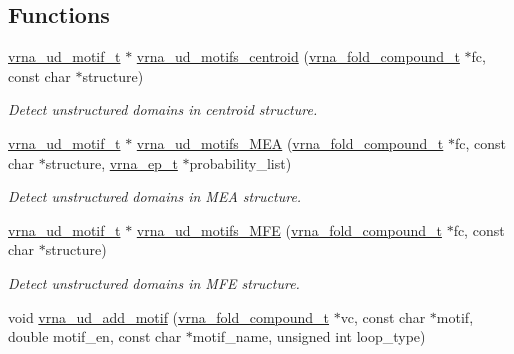 \subsection*{Functions}
\begin{DoxyCompactItemize}
\item 
\hyperlink{structvrna__unstructured__domain__motif__s}{vrna\+\_\+ud\+\_\+motif\+\_\+t} $\ast$ \hyperlink{group__domains__up_ga2039caedf194c5edec794866986d95ec}{vrna\+\_\+ud\+\_\+motifs\+\_\+centroid} (\hyperlink{group__fold__compound_ga1b0cef17fd40466cef5968eaeeff6166}{vrna\+\_\+fold\+\_\+compound\+\_\+t} $\ast$fc, const char $\ast$structure)
\begin{DoxyCompactList}\small\item\em Detect unstructured domains in centroid structure. \end{DoxyCompactList}\item 
\hyperlink{structvrna__unstructured__domain__motif__s}{vrna\+\_\+ud\+\_\+motif\+\_\+t} $\ast$ \hyperlink{group__domains__up_ga980126e9f350b64474b35f20fce2782c}{vrna\+\_\+ud\+\_\+motifs\+\_\+\+M\+EA} (\hyperlink{group__fold__compound_ga1b0cef17fd40466cef5968eaeeff6166}{vrna\+\_\+fold\+\_\+compound\+\_\+t} $\ast$fc, const char $\ast$structure, \hyperlink{group__struct__utils__plist_gab9ac98ab55ded9fb90043b024b915aca}{vrna\+\_\+ep\+\_\+t} $\ast$probability\+\_\+list)
\begin{DoxyCompactList}\small\item\em Detect unstructured domains in M\+EA structure. \end{DoxyCompactList}\item 
\hyperlink{structvrna__unstructured__domain__motif__s}{vrna\+\_\+ud\+\_\+motif\+\_\+t} $\ast$ \hyperlink{group__domains__up_ga464d086264dd6f45089a65acec4e8c21}{vrna\+\_\+ud\+\_\+motifs\+\_\+\+M\+FE} (\hyperlink{group__fold__compound_ga1b0cef17fd40466cef5968eaeeff6166}{vrna\+\_\+fold\+\_\+compound\+\_\+t} $\ast$fc, const char $\ast$structure)
\begin{DoxyCompactList}\small\item\em Detect unstructured domains in M\+FE structure. \end{DoxyCompactList}\item 
void \hyperlink{group__domains__up_ga55f7de5ef5b7472b0eeab9296b57f671}{vrna\+\_\+ud\+\_\+add\+\_\+motif} (\hyperlink{group__fold__compound_ga1b0cef17fd40466cef5968eaeeff6166}{vrna\+\_\+fold\+\_\+compound\+\_\+t} $\ast$vc, const char $\ast$motif, double motif\+\_\+en, const char $\ast$motif\+\_\+name, unsigned int loop\+\_\+type)

\end{DoxyCompactItemize}
